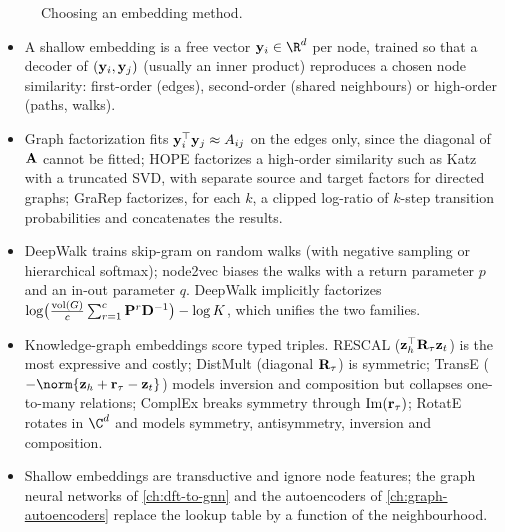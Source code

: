 \begin{notechapter}
\begin{figure}[htbp]
\caption{Choosing an embedding method.}
\end{figure}

\begin{chaptersummary}
\begin{itemize}
\item A shallow embedding is a free vector $\vect y_i \in \R^d$ per node, trained so that a decoder of $(\mathbf{y}_i, \mathbf{y}_j)$ (usually an inner product) reproduces a chosen node similarity: first-order (edges), second-order (shared neighbours) or high-order (paths, walks).
\item Graph factorization fits $\mathbf{y}_i^\top\mathbf{y}_j \approx A_{ij}$ on the edges only, since the diagonal of $\mathbf{A}$ cannot be fitted; HOPE factorizes a high-order similarity such as Katz with a truncated SVD, with separate source and target factors for directed graphs; GraRep factorizes, for each $k$, a clipped log-ratio of $k$-step transition probabilities and concatenates the results.
\item DeepWalk trains skip-gram on random walks (with negative sampling or hierarchical softmax); node2vec biases the walks with a return parameter $p$ and an in-out parameter $q$. DeepWalk implicitly factorizes $\log\bigl(\frac{\mathrm{vol}(G)}{c}\sum_{r=1}^c\mathbf{P}^r\mathbf{D}^{-1}\bigr) - \log K$, which unifies the two families.
\item Knowledge-graph embeddings score typed triples. RESCAL ($\mathbf{z}_h^\top\mathbf{R}_\tau\mathbf{z}_t$) is the most expressive and costly; DistMult (diagonal $\mathbf{R}_\tau$) is symmetric; TransE ($-\norm{\vect z_h + \vect r_\tau - \vect z_t}$) models inversion and composition but collapses one-to-many relations; ComplEx breaks symmetry through $\mathrm{Im}(\mathbf{r}_\tau)$; RotatE rotates in $\C^d$ and models symmetry, antisymmetry, inversion and composition.
\item Shallow embeddings are transductive and ignore node features; the graph neural networks of \cref{ch:dft-to-gnn} and the autoencoders of \cref{ch:graph-autoencoders} replace the lookup table by a function of the neighbourhood.
\end{itemize}
\end{chaptersummary}


\end{notechapter}
